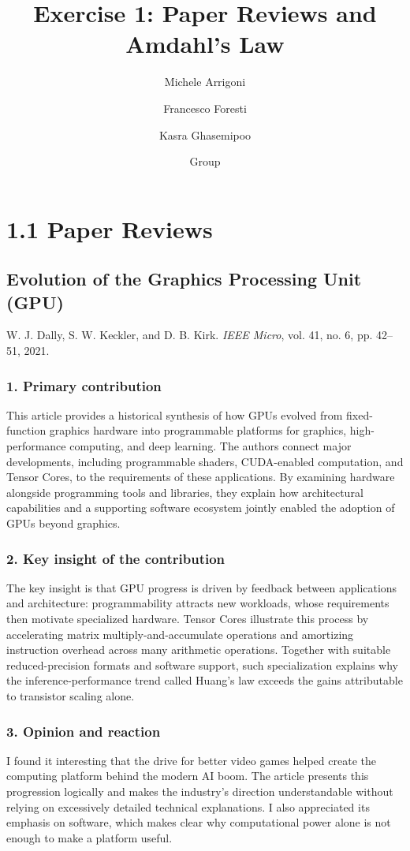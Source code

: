 \documentclass[11pt,a4paper]{article}
\title{Exercise 1: Paper Reviews and Amdahl's Law}
\author{Michele Arrigoni \and Francesco Foresti \and Kasra Ghasemipoo}
\date{Group \groupnumber}
\begin{document}
\maketitle
\vspace{-2em}

\section*{1.1 Paper Reviews}
\subsection*{Evolution of the Graphics Processing Unit (GPU)}
{\small W. J. Dally, S. W. Keckler, and D. B. Kirk.
\emph{IEEE Micro}, vol. 41, no. 6, pp. 42--51, 2021.}

\subsubsection*{1. Primary contribution}
This article provides a historical synthesis of how GPUs evolved from
fixed-function graphics hardware into programmable platforms for graphics,
high-performance computing, and deep learning.
The authors connect major developments, including programmable shaders,
CUDA-enabled computation, and Tensor Cores, to the requirements of these
applications.
By examining hardware alongside programming tools and libraries, they
explain how architectural capabilities and a supporting software ecosystem
jointly enabled the adoption of GPUs beyond graphics.

\subsubsection*{2. Key insight of the contribution}
The key insight is that GPU progress is driven by feedback between applications
and architecture: programmability attracts new workloads, whose requirements
then motivate specialized hardware.
Tensor Cores illustrate this process by accelerating matrix
multiply-and-accumulate operations and amortizing instruction overhead
across many arithmetic operations.
Together with suitable reduced-precision formats and software support,
such specialization explains why the inference-performance trend called
Huang's law exceeds the gains attributable to transistor scaling alone.

\subsubsection*{3. Opinion and reaction}
I found it interesting that the drive for better video games helped create
the computing platform behind the modern AI boom.
The article presents this progression logically and makes the industry's
direction understandable without relying on excessively detailed technical
explanations.
I also appreciated its emphasis on software, which makes clear why
computational power alone is not enough to make a platform useful.
\end{document}
